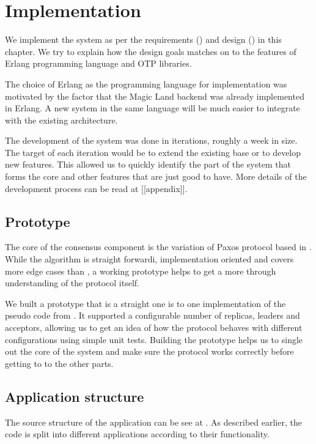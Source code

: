 \chapter{Implementation}
\label{chapter:implementation}

We implement the system as per the requirements () and 
design () in this chapter. We try to explain how the
design goals matches on to the features of Erlang \citep{erlang} programming
language and OTP libraries.

The choice of Erlang as the programming language for implementation was
motivated by the factor that the Magic Land backend was already implemented in
Erlang. A new system in the same language will be much easier to integrate with
the existing architecture.

The development of the system was done in iterations, roughly a week in size. 
The target of each iteration would be to extend the existing base or to develop 
new features. This allowed us to quickly identify the part of the system that
forms the core and other features that are just good to have. More details of
the development process can be read at [[appendix]].

\section{Prototype}

The core of the consensus component is the variation of Paxos protocol based
in \citet{Robbert2011}. While the algorithm is straight forwardi, implementation
oriented and covers more edge cases than \citet{Lamport01}, a working prototype
helps to get a more through understanding of the protocol itself.

We built a prototype that is a straight one is to one implementation of the 
pseudo code from \citet{Robbert2011}. It supported a configurable number of 
replicas, leaders and acceptors, allowing us to get an idea of how the protocol
behaves with different configurations using simple unit tests. Building the 
prototype helps us to single out the core of the system and make sure the 
protocol works correctly before getting to to the other parts.

\section{Application structure}

The source structure of the application can be see at .
As described earlier, the code is split into different applications according
to their functionality.











